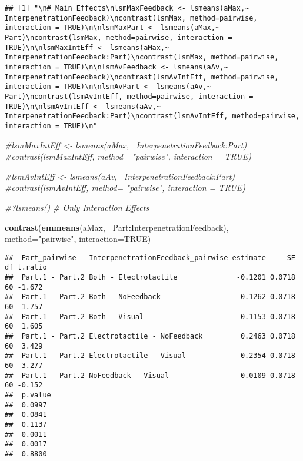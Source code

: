 \documentclass[
]{article}
\newenvironment{Shaded}{\begin{snugshade}}{\end{snugshade}}
\newcommand{\CommentTok}[1]{\textcolor[rgb]{0.56,0.35,0.01}{\textit{#1}}}
\newcommand{\DataTypeTok}[1]{\textcolor[rgb]{0.13,0.29,0.53}{#1}}
\newcommand{\KeywordTok}[1]{\textcolor[rgb]{0.13,0.29,0.53}{\textbf{#1}}}
\newcommand{\NormalTok}[1]{#1}
\newcommand{\OperatorTok}[1]{\textcolor[rgb]{0.81,0.36,0.00}{\textbf{#1}}}
\newcommand{\OtherTok}[1]{\textcolor[rgb]{0.56,0.35,0.01}{#1}}
\newcommand{\StringTok}[1]{\textcolor[rgb]{0.31,0.60,0.02}{#1}}
\begin{document}
\begin{verbatim}
## [1] "\n# Main Effects\nlsmMaxFeedback <- lsmeans(aMax,~ InterpenetrationFeedback)\ncontrast(lsmMax, method=pairwise, interaction = TRUE)\n\nlsmMaxPart <- lsmeans(aMax,~ Part)\ncontrast(lsmMax, method=pairwise, interaction = TRUE)\n\nlsmMaxIntEff <- lsmeans(aMax,~ InterpenetrationFeedback:Part)\ncontrast(lsmMax, method=pairwise, interaction = TRUE)\n\nlsmAvFeedback <- lsmeans(aAv,~ InterpenetrationFeedback)\ncontrast(lsmAvIntEff, method=pairwise, interaction = TRUE)\n\nlsmAvPart <- lsmeans(aAv,~ Part)\ncontrast(lsmAvIntEff, method=pairwise, interaction = TRUE)\n\nlsmAvIntEff <- lsmeans(aAv,~ InterpenetrationFeedback:Part)\ncontrast(lsmAvIntEff, method=pairwise, interaction = TRUE)\n"
\end{verbatim}

\begin{Shaded}
\begin{Highlighting}[]
\CommentTok{#lsmMaxIntEff <- lsmeans(aMax,~ InterpenetrationFeedback:Part)}
\CommentTok{#contrast(lsmMaxIntEff, method= "pairwise", interaction = TRUE)}

\CommentTok{#lsmAvIntEff <- lsmeans(aAv,~ InterpenetrationFeedback:Part)}
\CommentTok{#contrast(lsmAvIntEff, method= "pairwise", interaction = TRUE)}

\CommentTok{#?lsmeans()}
\CommentTok{# Only Interaction Effects}

\KeywordTok{contrast}\NormalTok{(}\KeywordTok{emmeans}\NormalTok{(aMax,}\OperatorTok{~}\StringTok{ }\NormalTok{Part}\OperatorTok{:}\NormalTok{InterpenetrationFeedback), }
         \DataTypeTok{method=}\StringTok{"pairwise"}\NormalTok{, }\DataTypeTok{interaction=}\OtherTok{TRUE}\NormalTok{)}
\end{Highlighting}
\end{Shaded}

\begin{verbatim}
##  Part_pairwise   InterpenetrationFeedback_pairwise estimate     SE df t.ratio
##  Part.1 - Part.2 Both - Electrotactile              -0.1201 0.0718 60 -1.672 
##  Part.1 - Part.2 Both - NoFeedback                   0.1262 0.0718 60  1.757 
##  Part.1 - Part.2 Both - Visual                       0.1153 0.0718 60  1.605 
##  Part.1 - Part.2 Electrotactile - NoFeedback         0.2463 0.0718 60  3.429 
##  Part.1 - Part.2 Electrotactile - Visual             0.2354 0.0718 60  3.277 
##  Part.1 - Part.2 NoFeedback - Visual                -0.0109 0.0718 60 -0.152 
##  p.value
##  0.0997 
##  0.0841 
##  0.1137 
##  0.0011 
##  0.0017 
##  0.8800
\end{verbatim}
\end{document}
